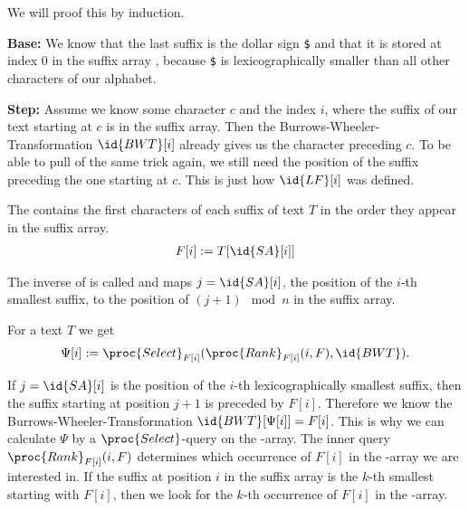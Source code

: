 \begin{Proof}
  We will proof this by induction.

  \textbf{Base:} We know that the last suffix is the dollar sign \texttt{\$} and that it is stored at index $0$ in the suffix array , because \texttt{\$} is lexicographically smaller than all other characters of our alphabet.

  \textbf{Step:} Assume we know some character $c$ and the index $i$, where the suffix of our text starting at $c$ is in the suffix array. Then the Burrows-Wheeler-Transformation $\id{BWT}[i]$ already gives us the character preceding $c$. To be able to pull of the same trick again, we still need the position of the suffix preceding the one starting at $c$. This is just how $\id{LF}[i]$ was defined.
\end{Proof}

\begin{Definition}
  The  contains the first characters of each suffix of text $T$ in the order they appear in the suffix array.
  \begin{align}
    F[i] := T[\id{SA}[i]]
  \end{align}
\end{Definition}

\begin{Definition}
  The inverse of  is called  and maps $j = \id{SA}[i]$, the position of the $i$-th smallest suffix, to the position of $(j+1) \mod n$ in the suffix array.
\end{Definition}

\begin{Theorem}
  For a text $T$ we get
  \begin{align}
    \Psi[i] := \proc{Select}_{F[i]}(\proc{Rank}_{F[i]}(i, F), \id{BWT})
    \text{.}
  \end{align}
\end{Theorem}

\begin{Proof}
  If $j = \id{SA}[i]$ is the position of the $i$-th lexicographically smallest suffix, then the suffix starting at position $j+1$ is preceded by $F[i]$. Therefore we know the Burrows-Wheeler-Transformation $\id{BWT}[\Psi[i]] = F[i]$. This is why we can calculate $\Psi$ by a $\proc{Select}$-query on the -array. The inner query $\proc{Rank}_{F[i]}(i, F)$ determines which occurrence of $F[i]$ in the -array we are interested in. If the suffix at position $i$ in the suffix array is the $k$-th smallest starting with $F[i]$, then we look for the $k$-th occurrence of $F[i]$ in the -array.
\end{Proof}

